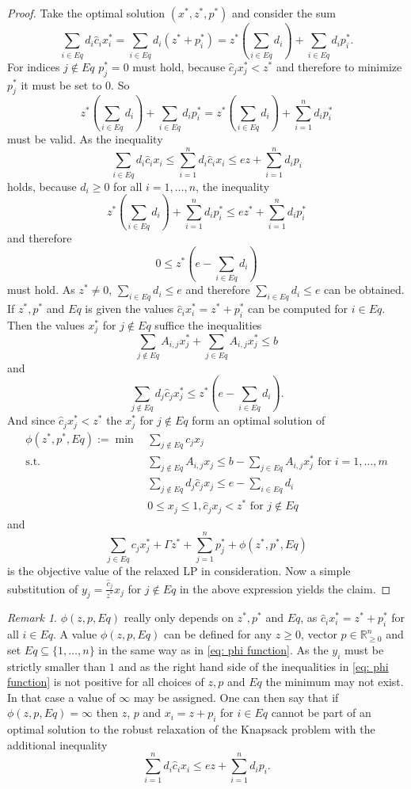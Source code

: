 \documentclass[titlepage, a4paper]{amsbook}
\theoremstyle{plain}
\theoremstyle{break}
\theoremstyle{definition}
\theoremstyle{remark}
\newtheorem{rem}[thm]{Remark}
\numberwithin{equation}{thm}
\begin{document}
\begin{proof}
Take the optimal solution $(x^*,z^*,p^*)$ and consider the sum
\[\sum_{i \in Eq} d_i \hat{c}_i x^*_i = \sum_{i \in Eq} d_i (z^*+p^*_i) = z^*(\sum_{i \in Eq} d_i) + \sum_{i \in Eq} d_i p^*_i.\]
For indices $j \notin Eq$ $p^*_j=0$ must hold, because $\hat{c}_j x^*_j < z^*$ and therefore to minimize $p^*_j$ it must be set to $0$.
So 
\[z^*(\sum_{i \in Eq} d_i) + \sum_{i \in Eq} d_i p^*_i= z^*(\sum_{i \in Eq} d_i) + \sum_{i=1}^n d_i p^*_i\]
must be valid. As the inequality 
\[\sum_{i \in Eq} d_i \hat{c}_i x_i \leq \sum_{i=1}^n d_i \hat{c}_i x_i \leq e z + \sum_{i=1}^n d_i p_i\]
holds, because $d_i \geq 0$ for all $i=1, \ldots, n$, the inequality
\[ z^*(\sum_{i \in Eq} d_i) + \sum_{i=1}^n d_i p^*_i \leq e z^* + \sum_{i=1}^n d_i p^*_i\]
and therefore
\[0 \leq z^*(e - \sum_{i \in Eq} d_i)\]
must hold. As $z^* \neq 0$, $\sum_{i \in Eq} d_i \leq e$ and therefore $\sum_{i \in Eq} d_i \leq e$ can be obtained.
If $z^*, p^*$ and $Eq$ is given the values $\hat{c}_ix^*_i=z^*+p^*_i$ can be computed for $i \in Eq$. Then the values $x^*_j$ for $j \notin Eq$ suffice the inequalities
\[\sum_{j \notin Eq}A_{i,j}x^*_j + \sum_{j \in Eq}A_{i,j}x^*_j \leq b\]
and 
\[\sum_{j \notin Eq}d_j \hat{c}_j x^*_j \leq z^*(e-\sum_{i \in Eq}d_i).\]
And since $\hat{c}_j x^*_j < z^*$ the $x^*_j$ for $j \notin Eq$ form an optimal solution of 
\begin{equation*}
\begin{split}
\phi(z^*, p^*, Eq):=\min\, &\sum_{j \notin Eq}c_j x_j \\
\text{s.t. }&\sum_{j \notin Eq}A_{i,j}x_j \leq b-\sum_{j \in Eq}A_{i,j}x^*_j \text{ for }i=1, \ldots, m\\
&\sum_{j \notin Eq}d_j\hat{c}_j x_j \leq e - \sum_{i \in Eq}d_i \\
&0 \leq x_j \leq 1,  \hat{c}_j x_j < z^* \text{ for }j \notin Eq
\end{split}
\end{equation*}
and 
\[\sum_{j \in Eq}c_j x^*_j + \Gamma z^* + \sum_{j=1}^n p^*_j + \phi(z^*, p^*, Eq)\]
is the objective value of the relaxed LP in consideration. 
Now a simple substitution of $y_j=\frac{\hat{c}_j}{z^*}x_j$ for $j \notin Eq$ in the above expression yields the claim.
\end{proof}
\begin{rem}
$\phi(z, p, Eq)$ really only depends on $z^*, p^*$ and $Eq$, as $\hat{c}_ix^*_i=z^* + p^*_i$ for all $i \in Eq$. 
A value $\phi(z, p, Eq)$ can be defined for any $z \geq 0$, vector $p \in \mathbb{R}_{\geq 0}^n$ and set $Eq \subseteq \{1, \ldots, n\}$ in the same way as in \eqref{eq: phi function}. As the $y_i$ must be strictly smaller than $1$ and as the right hand side of the inequalities in \eqref{eq: phi function} is not positive for all choices of $z, p$ and $Eq$ the minimum may not exist. In that case a value of $\infty$ may be assigned. One can then say that if $\phi(z, p, Eq) = \infty$ then $z$, $p$ and $x_i=z+p_i$ for $i \in Eq$ cannot be part of an optimal solution to the robust relaxation of the Knapsack problem with the additional inequality 
\[\sum_{i=1}^n d_i \hat{c}_i x_i \leq e z + \sum_{i=1}^n d_i p_i.\]
\end{rem}
\end{document}
